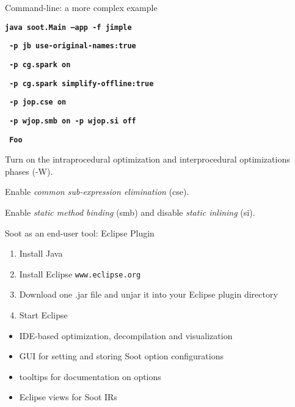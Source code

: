 \begin{slide}{Command-line: a more complex example}

\begin{small}
\textbf{\texttt{java soot.Main  --app -f jimple}}

\textbf{\texttt{     -p jb use-original-names:true }}

\textbf{\texttt{     -p cg.spark on }}

\textbf{\texttt{     -p cg.spark simplify-offline:true}}

\textbf{\red\texttt{     -p jop.cse on   }}

\textbf{\red\texttt{     -p wjop.smb on  -p wjop.si off}}

\textbf{\texttt{     Foo }}
\end{small}

\vspace{.2in}

\begin{footnotesize}
Turn on 
the intraprocedural optimization and interprocedural optimizations phases (-W). 

Enable \textit{common sub-expression elimination} (cse).

Enable \textit{static method binding} (smb) and disable \textit{static
inlining} (si). 
\end{footnotesize}

\end{slide}

\begin{slide}{Soot as an end-user tool:  Eclipse Plugin}
\vspace{-0.1in}
\begin{small}
\begin{enumerate}
\item Install Java
\item Install Eclipse {\tt www.eclipse.org}
\item Download one .jar file and unjar it into your Eclipse plugin directory 
\item Start Eclipse 
\end{enumerate}

\begin{itemize}
\item IDE-based optimization, decompilation and visualization
\item GUI for setting and storing Soot option configurations
\item tooltips for documentation on options
\item Eclipse views for Soot IRs
\end{itemize}
\end{small}
\end{slide}

